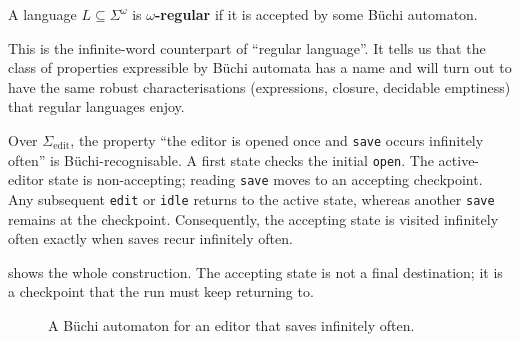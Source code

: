 \begin{definition}
\label{def:omega-regular-language}
A language $L\subseteq\Sigma^\omega$ is \textbf{$\omega$-regular} if it
is accepted by some B\"uchi automaton.
\end{definition}

This is the infinite-word counterpart of ``regular language''.  It tells
us that the class of properties expressible by B\"uchi automata has a
name and will turn out to have the same robust characterisations
(expressions, closure, decidable emptiness) that regular languages enjoy.

\begin{example}
\label{ex:buchi-infinitely-many-save}
Over $\Sigma_{\mathrm{edit}}$, the property
``the editor is opened once and \texttt{save} occurs infinitely often''
is B\"uchi-recognisable.  A first state checks the initial
\texttt{open}.  The active-editor state is non-accepting; reading
\texttt{save} moves to an accepting checkpoint.  Any subsequent
\texttt{edit} or \texttt{idle} returns to the active state, whereas
another \texttt{save} remains at the checkpoint.  Consequently, the
accepting state is visited infinitely often exactly when saves recur
infinitely often.
\end{example}

 shows the whole construction.  The
accepting state is not a final destination; it is a checkpoint that the
run must keep returning to.

\begin{figure}[ht]
\centering
{}
\caption{A B\"uchi automaton for an editor that saves infinitely often.}
\label{fig:infinitely-many-save}
\end{figure}

